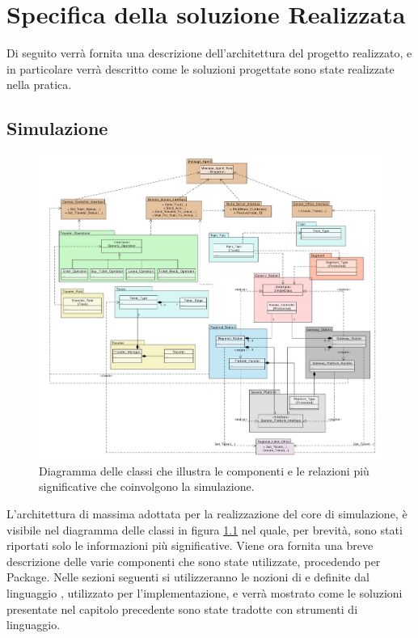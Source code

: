 \newpage
\chapter {Specifica della soluzione Realizzata}

Di seguito verrà fornita una descrizione dell'architettura del progetto realizzato, e in particolare verrà descritto come le soluzioni progettate sono state realizzate nella pratica.

\section{Simulazione}

	\begin{figure}[htbp]
		\includegraphics[scale=0.39,trim= 100mm 0mm 0mm 0mm]{imgs/Simplified_Class_Diagram.pdf}
		\caption{\footnotesize{Diagramma delle classi che illustra le componenti e le relazioni più significative che coinvolgono la simulazione.}}
		\label{img:class_diagram}
	\end{figure}

L'architettura di massima adottata per la realizzazione del core di simulazione, è visibile nel diagramma delle classi in figura \ref{img:class_diagram} nel quale, per brevità, sono stati riportati solo le informazioni più significative.
	Viene ora fornita una breve descrizione delle varie componenti che sono state utilizzate, procedendo per Package. Nelle sezioni seguenti si utilizzeranno le nozioni di  e  definite dal linguaggio , utilizzato per l'implementazione, e verrà mostrato come le soluzioni presentate nel capitolo precedente sono state tradotte con strumenti di linguaggio.

